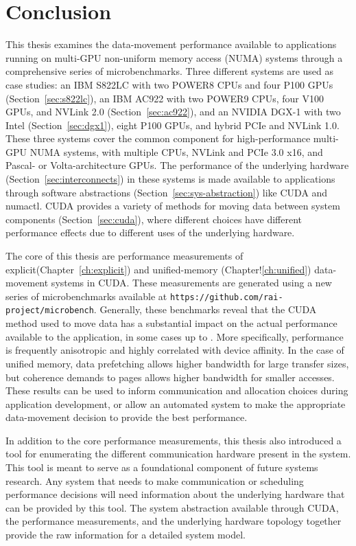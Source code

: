 \chapter{Conclusion}
\label{ch:conclusion}

This thesis examines the data-movement performance available to applications running on multi-GPU non-uniform memory access (NUMA) systems through a comprehensive series of microbenchmarks.
Three different systems are used as case studies: an IBM S822LC with two POWER8 CPUs and four P100 GPUs (Section~\ref{sec:s822lc}), an IBM AC922 with two POWER9 CPUs, four V100 GPUs, and NVLink 2.0 (Section~\ref{sec:ac922}), and an NVIDIA DGX-1 with two Intel (Section~\ref{sec:dgx1}), eight P100 GPUs, and hybrid PCIe and NVLink 1.0.
These three systems cover the common component for high-performance multi-GPU NUMA systems, with multiple CPUs, NVLink and PCIe 3.0 x16, and Pascal- or Volta-architecture GPUs.
The performance of the underlying hardware (Section~\ref{sec:interconnects}) in these systems is made available to applications through software abstractions (Section~\ref{sec:sys-abstraction}) like CUDA and numactl.
CUDA provides a variety of methods for moving data between system components (Section~\ref{sec:cuda}), where different choices have different performance effects due to different uses of the underlying hardware.

The core of this thesis are performance measurements of explicit(Chapter~\ref{ch:explicit}) and unified-memory (Chapter!\ref{ch:unified}) data-movement systems in CUDA.
These measurements are generated using a new series of microbenchmarks available at \texttt{https://github.com/rai-project/microbench}.
Generally, these benchmarks reveal that the CUDA method used to move data has a substantial impact on the actual performance available to the application, in some cases up to .
More specifically, performance is frequently anisotropic and highly correlated with device affinity.
In the case of unified memory, data prefetching allows higher bandwidth for large transfer sizes, but coherence demands to pages allows higher bandwidth for smaller accesses.
These results can be used to inform communication and allocation choices during application development, or allow an automated system to make the appropriate data-movement decision to provide the best performance.

In addition to the core performance measurements, this thesis also introduced a tool for enumerating the different communication hardware present in the system.
This tool is meant to serve as a foundational component of future systems research.
Any system that needs to make communication or scheduling performance decisions will need information about the underlying hardware that can be provided by this tool.
The system abstraction available through CUDA, the performance measurements, and the underlying hardware topology together provide the raw information for a detailed system model.


